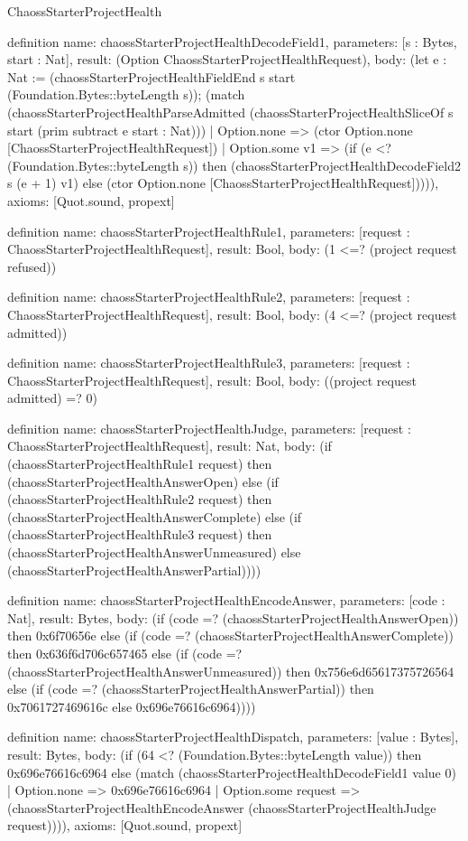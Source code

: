 \begin{lexlean}{ChaossStarterProjectHealth}
\begin{semanticmodule}
definition{
  name: chaossStarterProjectHealthDecodeField1,
  parameters: [s : Bytes, start : Nat],
  result: (Option ChaossStarterProjectHealthRequest),
  body: (let e : Nat := (chaossStarterProjectHealthFieldEnd s start (Foundation.Bytes::byteLength s)); (match (chaossStarterProjectHealthParseAdmitted (chaossStarterProjectHealthSliceOf s start (prim subtract e start : Nat)))
    | Option.none => (ctor Option.none [ChaossStarterProjectHealthRequest])
    | Option.some v1 => (if (e <? (Foundation.Bytes::byteLength s)) then (chaossStarterProjectHealthDecodeField2 s (e + 1) v1) else (ctor Option.none [ChaossStarterProjectHealthRequest])))),
  axioms: [Quot.sound, propext]
}

definition{
  name: chaossStarterProjectHealthRule1,
  parameters: [request : ChaossStarterProjectHealthRequest],
  result: Bool,
  body: (1 <=? (project request refused))
}

definition{
  name: chaossStarterProjectHealthRule2,
  parameters: [request : ChaossStarterProjectHealthRequest],
  result: Bool,
  body: (4 <=? (project request admitted))
}

definition{
  name: chaossStarterProjectHealthRule3,
  parameters: [request : ChaossStarterProjectHealthRequest],
  result: Bool,
  body: ((project request admitted) =? 0)
}

definition{
  name: chaossStarterProjectHealthJudge,
  parameters: [request : ChaossStarterProjectHealthRequest],
  result: Nat,
  body: (if (chaossStarterProjectHealthRule1 request) then (chaossStarterProjectHealthAnswerOpen) else (if (chaossStarterProjectHealthRule2 request) then (chaossStarterProjectHealthAnswerComplete) else (if (chaossStarterProjectHealthRule3 request) then (chaossStarterProjectHealthAnswerUnmeasured) else (chaossStarterProjectHealthAnswerPartial))))
}

definition{
  name: chaossStarterProjectHealthEncodeAnswer,
  parameters: [code : Nat],
  result: Bytes,
  body: (if (code =? (chaossStarterProjectHealthAnswerOpen)) then 0x6f70656e else (if (code =? (chaossStarterProjectHealthAnswerComplete)) then 0x636f6d706c657465 else (if (code =? (chaossStarterProjectHealthAnswerUnmeasured)) then 0x756e6d65617375726564 else (if (code =? (chaossStarterProjectHealthAnswerPartial)) then 0x7061727469616c else 0x696e76616c6964))))
}

definition{
  name: chaossStarterProjectHealthDispatch,
  parameters: [value : Bytes],
  result: Bytes,
  body: (if (64 <? (Foundation.Bytes::byteLength value)) then 0x696e76616c6964 else (match (chaossStarterProjectHealthDecodeField1 value 0)
    | Option.none => 0x696e76616c6964
    | Option.some request => (chaossStarterProjectHealthEncodeAnswer (chaossStarterProjectHealthJudge request)))),
  axioms: [Quot.sound, propext]
}
\end{semanticmodule}
\end{lexlean}
